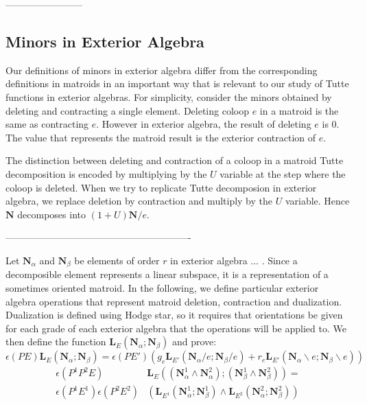 \documentclass[Unicode]{cedram-alco}
\newcommand{\ext}[1]{\ensuremath{\mathbf{#1}}}
\newcommand{\eNal}{\ensuremath{\ext{N}_{\alpha}}}
\newcommand{\eNbe}{\ensuremath{\ext{N}_\beta}}
\newcommand{\extLHorSub}[3]{\ext{L}_{#1}\left(  {#2}; {#3}  \right)}
\newcommand{\LHorSub}[3]{\ext{L}_{#1}\left(  {#2}; {#3}  \right)}
\begin{document}
------------------------

\subsection{Minors in Exterior Algebra}
Our definitions of minors in exterior algebra differ from
the corresponding definitions in matroids in an important
way that is relevant to our study of Tutte functions in exterior
algebras. For simplicity, consider the minors obtained by
deleting and contracting a single element.  Deleting coloop $e$
in a matroid is the same as contracting $e$.  However in exterior
algebra, the result of deleting $e$ is 0.  The value that represents the
matroid result is the exterior contraction of $e$.

The distinction between deleting and contraction of a coloop
in a matroid Tutte decomposition is encoded by multiplying
by the $U$ variable at the step where the coloop is deleted.
When we try to replicate Tutte decomposion in exterior algebra,
we replace deletion by contraction and multiply by the $U$ variable.
Hence $\ext{N}$ decomposes into $(1+U)\ext{N}/e$.

----------------------------------------------------------


Let $\ext{N}_\alpha$ and $\ext{N}_\beta$ be elements of order
$r$ in exterior algebra ... .  Since a decomposible element
represents a linear subspace, it is a representation of a
sometimes oriented matroid.  In the following, we define
particular exterior algebra operations that represent
matroid deletion, contraction and dualization.  Dualization is
defined using Hodge star, so it requires that orientations
be given for each grade of each exterior algebra that the
operations will be applied to.  We then define
the function $\ext{L}_E(\ext{N}_\alpha;\ext{N}_\beta)$ and prove:
  \begin{equation}\label{delecontrequationintro}
     \epsilon(PE)\extLHorSub{E}{\eNal}{\eNbe}=
      \epsilon(PE')
      \left(
      g_e\extLHorSub{E'}{\eNal/e}{\eNbe/e} +
      r_e\extLHorSub{E'}{\eNal\backslash e}{\eNbe\backslash e}\right)
  \end{equation}
  \begin{equation}\label{productequationintro}
    \begin{split}
    \epsilon(P^1P^2E)
    &\LHorSub{E}
            {(\ext{N}_\alpha^{1}\wedge\ext{N}_\alpha^{2})}
            {(\ext{N}_\beta^{1}\wedge\ext{N}_\beta^{2})}
    = \\
    \epsilon(P^{1}E^{1})
    \epsilon(P^{2}E^{2}) 
        &\left(\LHorSub{E^{1}}{\ext{N}_\alpha^{1}}{\ext{N}_\beta^{1}}
        \wedge
        \LHorSub{E^{2}}{\ext{N}_\alpha^{2}}{\ext{N}_\beta^{2}}
          \right)
    \end{split}
  \end{equation}
\end{document}
